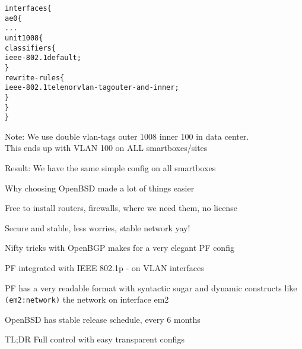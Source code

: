 \documentclass[18pt,landscape,a4paper,footrule]{foils}
\begin{document}

\begin{alltt}\small
interfaces \{
    ae0 \{
        ...
        unit 1008 \{
            classifiers \{
                ieee-802.1 default;
            \}
            rewrite-rules \{
                ieee-802.1 telenor vlan-tag outer-and-inner;
            \}
        \}
\}
\end{alltt}

Note: We use double vlan-tags outer 1008 inner 100 in data center.\\
This ends up with VLAN 100 on ALL smartboxes/sites

Result: We have the same simple config on all smartboxes


Why choosing OpenBSD made a lot of things easier

\begin{list2}
\item Free to install routers, firewalls, where we need them, no license
\item Secure and stable, less worries, stable network yay!
\item Nifty tricks with OpenBGP makes for a very elegant PF config
\item PF integrated with IEEE 802.1p - on VLAN interfaces
\item PF has a very readable format with syntactic sugar and dynamic constructs like \verb+(em2:network)+ the network on interface em2
\item OpenBSD has stable release schedule, every 6 months
\end{list2}

TL;DR Full control with easy transparent configs

\end{document}

